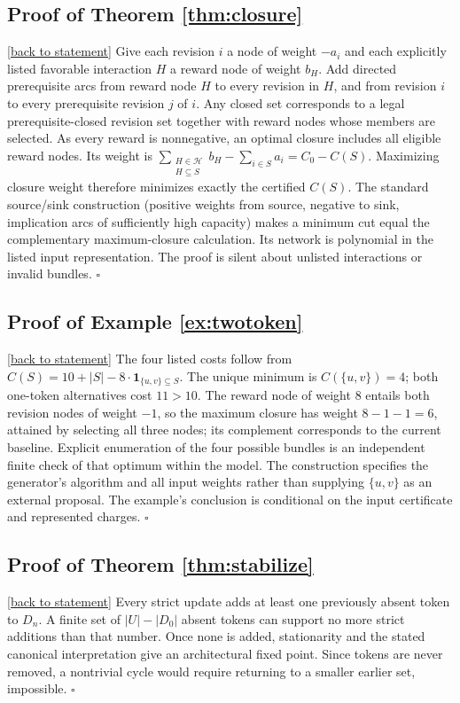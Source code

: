 \documentclass[11pt,letterpaper]{article}
\theoremstyle{definition}
\theoremstyle{remark}
\newcommand{\backlink}[1]{\hyperlink{claim:#1}{\footnotesize[back to statement]}}
\begin{document}
\hypertarget{proof:closure}{}\subsection*{Proof of Theorem \ref{thm:closure}}\backlink{closure}
Give each revision $i$ a node of weight $-a_i$ and each explicitly listed favorable interaction $H$ a reward node of weight $b_H$. Add directed prerequisite arcs from reward node $H$ to every revision in $H$, and from revision $i$ to every prerequisite revision $j$ of $i$. Any closed set corresponds to a legal prerequisite-closed revision set together with reward nodes whose members are selected. As every reward is nonnegative, an optimal closure includes all eligible reward nodes. Its weight is $\sum_{\substack{H\in\mathcal H\\H\subseteq S}}b_H-\sum_{i\in S}a_i=C_0-C(S)$. Maximizing closure weight therefore minimizes exactly the certified $C(S)$. The standard source/sink construction (positive weights from source, negative to sink, implication arcs of sufficiently high capacity) makes a minimum cut equal the complementary maximum-closure calculation. Its network is polynomial in the listed input representation. The proof is silent about unlisted interactions or invalid bundles. $\square$

\hypertarget{proof:twotoken}{}\subsection*{Proof of Example \ref{ex:twotoken}}\backlink{twotoken}
The four listed costs follow from $C(S)=10+\lvert S\rvert-8\cdot\mathbf 1_{\{u,v\}\subseteq S}$. The unique minimum is $C(\{u,v\})=4$; both one-token alternatives cost $11>10$. The reward node of weight $8$ entails both revision nodes of weight $-1$, so the maximum closure has weight $8-1-1=6$, attained by selecting all three nodes; its complement corresponds to the current baseline. Explicit enumeration of the four possible bundles is an independent finite check of that optimum within the model. The construction specifies the generator's algorithm and all input weights rather than supplying $\{u,v\}$ as an external proposal. The example's conclusion is conditional on the input certificate and represented charges. $\square$

\hypertarget{proof:stabilize}{}\subsection*{Proof of Theorem \ref{thm:stabilize}}\backlink{stabilize}
Every strict update adds at least one previously absent token to $D_n$. A finite set of $|U|-|D_0|$ absent tokens can support no more strict additions than that number. Once none is added, stationarity and the stated canonical interpretation give an architectural fixed point. Since tokens are never removed, a nontrivial cycle would require returning to a smaller earlier set, impossible. $\square$
\end{document}
